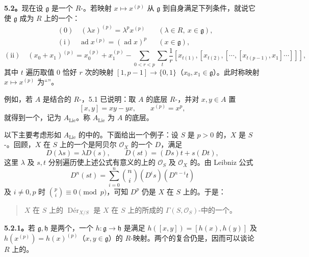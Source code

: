 \textbf{5.2。}现在设 $\mathfrak g$ 是一个 $R$-。若映射 $x\mapsto x^{(p)}$ 从 $\mathfrak g$ 到自身满足下列条件，就说它使 $\mathfrak g$ 成为 $R$ 上的一个：
\[
\begin{aligned}
 {}&(0)\quad (\lambda x)^{(p)}=\lambda^p x^{(p)}
 &&(\lambda\in R,\ x\in\mathfrak g),\\
 &(\mathrm i)\quad \operatorname{ad}x^{(p)}=(\operatorname{ad}x)^p
 &&(x\in\mathfrak g),
\end{aligned}
\]
\[
 (\mathrm{ii})\quad (x_0+x_1)^{(p)}=x_0^{(p)}+x_1^{(p)}-
 \sum_{0<r<p}\sum_t\frac1r
 [x_{t(1)},[x_{t(2)},[\cdots,[x_{t(p-1)},x_1]\cdots]]],
\]
其中 $t$ 遍历取值 $0$ 恰好 $r$ 次的映射 $[1,p-1]\to\{0,1\}$（$x_0,x_1\in\mathfrak g$）。此时称映射 $x\mapsto x^{(p)}$ 为“”。

例如，若 $A$ 是结合的 $R$-，5.1 已说明：取 $A$ 的底层 $R$-，并对 $x,y\in A$ 置
\[
 [x,y]=xy-yx,\qquad x^{(p)}=x^p,
\]
就得到一个，记为 $A_{\mathrm{Lie}}$。称 $A_{\mathrm{Lie}}$ 为 $A$ 的底层。

以下主要考虑形如 $A_{\mathrm{Lie}}$ 的中的。下面给出一个例子：设 $S$ 是 $p>0$ 的，$X$ 是 $S$-。回顾，$X$ 在 $S$ 上的一个是阿贝尔 $\mathcal O_X$ 的一个 $D$，满足
\[
 D(\lambda s)=\lambda D(s),\qquad D(st)=(Ds)t+s(Dt),
\]
这里 $\lambda$ 及 $s,t$ 分别遍历使上述公式有意义的上的 $\mathcal O_S$ 及 $\mathcal O_X$ 的。由 Leibniz 公式
\[
 D^n(st)=\sum_{i=0}^n\binom ni(D^is)(D^{n-i}t)
\]
及 $i\ne0,p$ 时 $\binom pi\equiv0\pmod p$，可知 $D^p$ 仍是 $X$ 在 $S$ 上的。于是：
\begin{quote}
$X$ 在 $S$ 上的 $\operatorname{D\text{é}r}_{X/S}$ 是 $X$ 在 $S$ 上的所成的 $\Gamma(S,\mathcal O_S)$-中的一个。
\end{quote}

\textbf{5.2.1。}若 $\mathfrak g,\mathfrak h$ 是两个，一个 $h:\mathfrak g\to\mathfrak h$ 是满足
$h([x,y])=[h(x),h(y)]$ 及 $h(x^{(p)})=h(x)^{(p)}$（$x,y\in\mathfrak g$）的 $R$-映射。两个的复合仍是，因而可以谈论 $R$ 上的。

